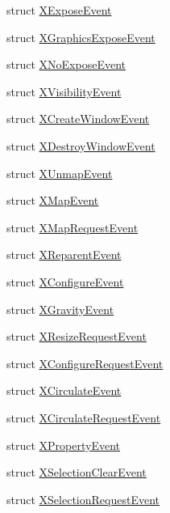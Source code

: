 \begin{DoxyCompactItemize}
\item 
struct \hyperlink{struct_tao_1_1_platform_1_1_x11_1_1_x_expose_event}{XExposeEvent}
\item 
struct \hyperlink{struct_tao_1_1_platform_1_1_x11_1_1_x_graphics_expose_event}{XGraphicsExposeEvent}
\item 
struct \hyperlink{struct_tao_1_1_platform_1_1_x11_1_1_x_no_expose_event}{XNoExposeEvent}
\item 
struct \hyperlink{struct_tao_1_1_platform_1_1_x11_1_1_x_visibility_event}{XVisibilityEvent}
\item 
struct \hyperlink{struct_tao_1_1_platform_1_1_x11_1_1_x_create_window_event}{XCreateWindowEvent}
\item 
struct \hyperlink{struct_tao_1_1_platform_1_1_x11_1_1_x_destroy_window_event}{XDestroyWindowEvent}
\item 
struct \hyperlink{struct_tao_1_1_platform_1_1_x11_1_1_x_unmap_event}{XUnmapEvent}
\item 
struct \hyperlink{struct_tao_1_1_platform_1_1_x11_1_1_x_map_event}{XMapEvent}
\item 
struct \hyperlink{struct_tao_1_1_platform_1_1_x11_1_1_x_map_request_event}{XMapRequestEvent}
\item 
struct \hyperlink{struct_tao_1_1_platform_1_1_x11_1_1_x_reparent_event}{XReparentEvent}
\item 
struct \hyperlink{struct_tao_1_1_platform_1_1_x11_1_1_x_configure_event}{XConfigureEvent}
\item 
struct \hyperlink{struct_tao_1_1_platform_1_1_x11_1_1_x_gravity_event}{XGravityEvent}
\item 
struct \hyperlink{struct_tao_1_1_platform_1_1_x11_1_1_x_resize_request_event}{XResizeRequestEvent}
\item 
struct \hyperlink{struct_tao_1_1_platform_1_1_x11_1_1_x_configure_request_event}{XConfigureRequestEvent}
\item 
struct \hyperlink{struct_tao_1_1_platform_1_1_x11_1_1_x_circulate_event}{XCirculateEvent}
\item 
struct \hyperlink{struct_tao_1_1_platform_1_1_x11_1_1_x_circulate_request_event}{XCirculateRequestEvent}
\item 
struct \hyperlink{struct_tao_1_1_platform_1_1_x11_1_1_x_property_event}{XPropertyEvent}
\item 
struct \hyperlink{struct_tao_1_1_platform_1_1_x11_1_1_x_selection_clear_event}{XSelectionClearEvent}
\item 
struct \hyperlink{struct_tao_1_1_platform_1_1_x11_1_1_x_selection_request_event}{XSelectionRequestEvent}

\end{DoxyCompactItemize}
